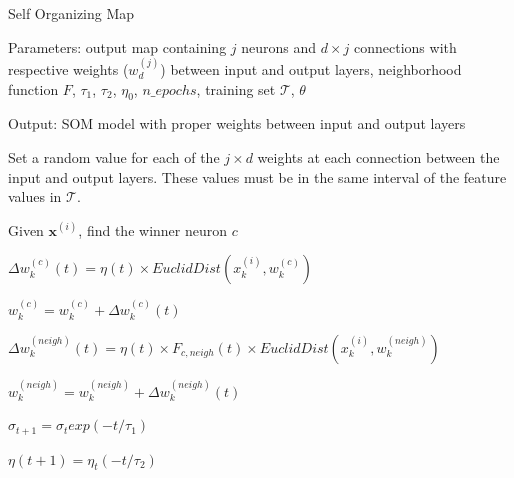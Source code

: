 \begin{algorithm}[h!]
    \caption{Self Organizing Map}
    
    Parameters: output map containing $j$ neurons and $d \times j$ connections with respective weights ($w_{d}^{(j)}$) between input and output layers, neighborhood function $F$, $\tau_1$, $\tau_2$, $\eta_{0}$, $n\_epochs$, training set $\mathcal{T}$, $\theta$  
    
    Output: SOM model with proper weights between input and output layers
    
    \begin{algorithmic}[1] 
    
    \STATE Set a random value for each of the $j \times d$ weights at each connection between the input and output layers. These values must be in the same interval of the feature values in $\mathcal{T}$.
    
    
    
      \STATE Given $\mathbf{x}^{(i)}$, find the winner neuron $c$ 
      
      
      \STATE $\Delta w_{k}^{(c)}(t) = \eta(t) \times EuclidDist(x_{k}^{(i)}, w_{k}^{(c)})$
      
      \STATE $w_{k}^{(c)} = w_{k}^{(c)} + \Delta w_{k}^{(c)}(t)$
      
      \ENDFOR
      
      
      
        
        
        \STATE $\Delta w_{k}^{(neigh)}(t) = \eta(t) \times F_{c,neigh}(t) \times EuclidDist(x_{k}^{(i)}, w_{k}^{(neigh)})$
        
        \STATE $w_{k}^{(neigh)} = w_{k}^{(neigh)} + \Delta w_{k}^{(neigh)}(t)$ 
        
        \ENDFOR
        
        
      \ENDFOR
    
    \ENDFOR
    
    \STATE $\sigma_{t+1} = \sigma_{t} exp(-t/\tau_{1})$ 
    
    \STATE $\eta (t+1) = \eta_{t} (-t/\tau_{2})$
    
    \ENDFOR %
    
    \end{algorithmic}


\label{alg:som}
    
\end{algorithm}

